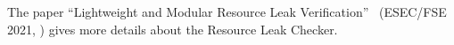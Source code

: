 





The paper ``Lightweight and Modular Resource Leak
Verification''~\cite{KelloggSSE2021} (ESEC/FSE 2021,
)
gives more details about the Resource Leak Checker.

